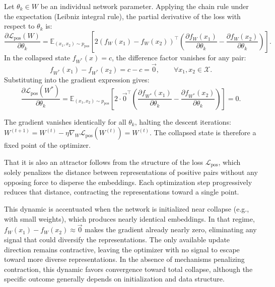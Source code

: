 \documentclass[11pt, oneside, openany]{book}
\begin{document}
Let $\theta_{k} \in W$ be an individual network parameter. Applying the chain rule under the expectation (Leibniz integral rule), the partial derivative of the loss with respect to $\theta_{k}$ is:
\begin{equation}
\label{eq:3.8}
\frac{\partial \mathcal{L}_{\text{pos}}(W)}{\partial \theta_{k}} = \mathbb{E}_{(x_{1}, x_{2}) \sim p_{\text{pos}}} \left[ 2 \left( f_{W}(x_{1}) - f_{W}(x_{2}) \right)^{\top} \left( \frac{\partial f_{W}(x_{1})}{\partial \theta_{k}} - \frac{\partial f_{W}(x_{2})}{\partial \theta_{k}} \right) \right].
\end{equation}
In the collapsed state $f_{W^{*}}(x) = c$, the difference factor vanishes for any pair:
\begin{equation}
\label{eq:3.9}
f_{W^{*}}(x_{1}) - f_{W^{*}}(x_{2}) = c - c = \vec{0}, \qquad \forall x_{1}, x_{2} \in \mathcal{X}.
\end{equation}
Substituting into the gradient expression gives:
\begin{equation}
\label{eq:3.10}
\frac{\partial \mathcal{L}_{\text{pos}}(W^{*})}{\partial \theta_{k}} = \mathbb{E}_{(x_{1}, x_{2}) \sim p_{\text{pos}}} \left[ 2 \cdot \vec{0}^{\top} \left( \frac{\partial f_{W^{*}}(x_{1})}{\partial \theta_{k}} - \frac{\partial f_{W^{*}}(x_{2})}{\partial \theta_{k}} \right) \right] = 0.
\end{equation}

The gradient vanishes identically for all $\theta_{k}$, halting the descent iterations: $W^{(t+1)} = W^{(t)} - \eta \nabla_{W} \mathcal{L}_{\text{pos}}(W^{(t)}) = W^{(t)}$. The collapsed state is therefore a fixed point of the optimizer.

That it is also an attractor follows from the structure of the loss $\mathcal{L}_{\text{pos}}$, which solely penalizes the distance between representations of positive pairs without any opposing force to disperse the embeddings. Each optimization step progressively reduces that distance, contracting the representations toward a single point.

This dynamic is accentuated when the network is initialized near collapse (e.g., with small weights), which produces nearly identical embeddings. In that regime, $f_{W}(x_{1}) - f_{W}(x_{2}) \approx \vec{0}$ makes the gradient already nearly zero, eliminating any signal that could diversify the representations. The only available update direction remains contractive, leaving the optimizer with no signal to escape toward more diverse representations. In the absence of mechanisms penalizing contraction, this dynamic favors convergence toward total collapse, although the specific outcome generally depends on initialization and data structure.
\end{document}
